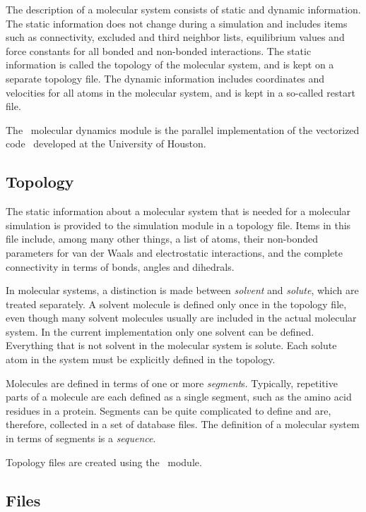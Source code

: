 The description of a molecular system consists of static and dynamic
information. The static information does not change during a
simulation and includes items such as connectivity, excluded and third
neighbor lists, equilibrium values and force constants for all
bonded and non-bonded interactions. The static information is called
the topology of the molecular system, and is kept on a separate
topology file. The dynamic information includes coordinates and
velocities for all atoms in the molecular system, and is kept in a
so-called restart file.

The \nwchem\ molecular dynamics module is the parallel implementation
of the vectorized code \argos\ developed at the University of Houston.

\subsection{Topology}
\label{sec:nwatopology}
The static information about a molecular system that is needed for
a molecular simulation is provided to the simulation module in a
topology file. 
Items in this file include, among many other things, 
a list of atoms, their non-bonded parameters for van der Waals and
electrostatic interactions, and the complete connectivity in terms
of bonds, angles and dihedrals.

In molecular systems, a distinction is made between 
{\it solvent} and {\it solute}, which are treated separately.
A solvent molecule is defined only once in the topology file,
even though many solvent molecules usually are included in the
actual molecular system. In the current implementation only one 
solvent can be defined. Everything that is not solvent in the 
molecular system is solute. Each solute atom in the system must 
be explicitly defined in the topology. 

Molecules are defined in terms of one or more {\it segment}s. 
Typically, repetitive parts of a molecule are each defined as a single
segment, such as the amino acid residues in a protein. 
Segments  can be quite complicated to define and are, therefore, 
collected in a set of database files. 
The definition of a molecular system in terms of segments is a
{\it sequence}.

Topology files are created using the \prepare\ module.

\subsection{Files}
\label{sec:nwafilenames}

